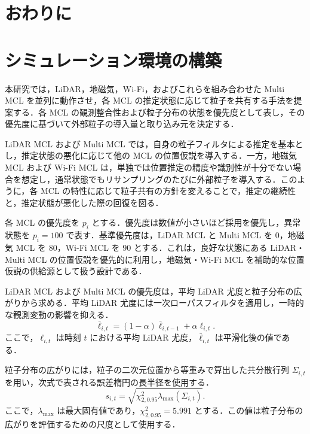 \section{おわりに}





\section{シミュレーション環境の構築}
\label{sec:sim_environment}

本研究では，LiDAR，地磁気，Wi-Fi，およびこれらを組み合わせた Multi MCL を並列に動作させ，各 MCL の推定状態に応じて粒子を共有する手法を提案する．各 MCL の観測整合性および粒子分布の状態を優先度として表し，その優先度に基づいて外部粒子の導入量と取り込み元を決定する．

LiDAR MCL および Multi MCL では，自身の粒子フィルタによる推定を基本とし，推定状態の悪化に応じて他の MCL の位置仮説を導入する．一方，地磁気 MCL および Wi-Fi MCL は，単独では位置推定の精度や識別性が十分でない場合を想定し，通常状態でもリサンプリングのたびに外部粒子を導入する．このように，各 MCL の特性に応じて粒子共有の方針を変えることで，推定の継続性と，推定状態が悪化した際の回復を図る．

各 MCL の優先度を $p_i$ とする．優先度は数値が小さいほど採用を優先し，異常状態を $p_i=100$ で表す．基準優先度は，LiDAR MCL と Multi MCL を $0$，地磁気 MCL を $80$，Wi-Fi MCL を $90$ とする．これは，良好な状態にある LiDAR・Multi MCL の位置仮説を優先的に利用し，地磁気・Wi-Fi MCL を補助的な位置仮説の供給源として扱う設計である．

LiDAR MCL および Multi MCL の優先度は，平均 LiDAR 尤度と粒子分布の広がりから求める．平均 LiDAR 尤度には一次ローパスフィルタを適用し，一時的な観測変動の影響を抑える．
\begin{equation}
  \bar{\ell}_{i,t}
  =
  (1-\alpha)\bar{\ell}_{i,t-1}
  +\alpha\ell_{i,t}.
  \label{eq:lidar_likelihood_lpf}
\end{equation}
ここで，$\ell_{i,t}$ は時刻 $t$ における平均 LiDAR 尤度，$\bar{\ell}_{i,t}$ は平滑化後の値である．

粒子分布の広がりには，粒子の二次元位置から等重みで算出した共分散行列 $\Sigma_{i,t}$ を用い，次式で表される誤差楕円の長半径を使用する．
\begin{equation}
  s_{i,t}
  =
  \sqrt{\chi^2_{2,0.95}\lambda_{\max}(\Sigma_{i,t})}.
  \label{eq:particle_spread}
\end{equation}
ここで，$\lambda_{\max}$ は最大固有値であり，$\chi^2_{2,0.95}=5.991$ とする．この値は粒子分布の広がりを評価するための尺度として使用する．

